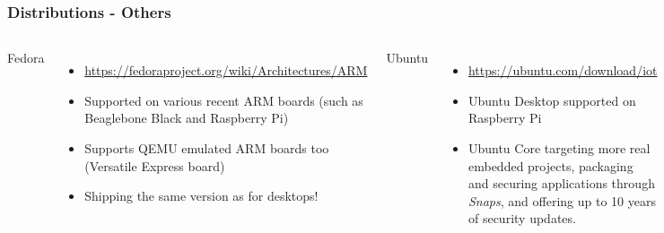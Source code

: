 \begin{frame}
  \frametitle{Distributions - Others}
  \begin{columns}[T]
    \small
    Fedora
    \begin{itemize}
    \item \url{https://fedoraproject.org/wiki/Architectures/ARM}
    \item Supported on various recent ARM boards (such as Beaglebone
      Black and Raspberry Pi)
    \item Supports QEMU emulated ARM boards too (Versatile Express board)
    \item Shipping the same version as for desktops!
    \end{itemize}
    Ubuntu
    \begin{itemize}
    \item \url{https://ubuntu.com/download/iot}
    \item Ubuntu Desktop supported on Raspberry Pi
    \item Ubuntu Core targeting more real embedded projects, packaging
	  and securing applications through {\em Snaps}, and offering
	  up to 10 years of security updates.
    \end{itemize}
    \texttt{[image: slides/sysdev-embedded-linux/fedora.pdf]}\\
    \tiny Image credits: \url{https://bit.ly/2EzmJLF}\\
    \vspace{4cm}
    \texttt{[image: common/ubuntu.pdf]}\\
    \tiny Image credits: \url{https://tinyurl.com/f4zxj5kw}
  \end{columns}
\end{frame}

